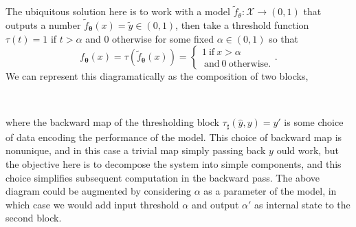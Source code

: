 \documentclass[10pt,a4paper]{article}
\begin{document}
The ubiquitous solution here is to work with a model $\tilde f_\theta:\mathcal X\rightarrow(0,1)$ that outputs a number $\tilde f_{\boldsymbol\theta}(x)=\tilde y\in(0,1)$, then take a threshold function $\tau(t)=1$ if $t>\alpha$ and $0$ otherwise for some fixed $\alpha\in(0,1)$ so that
$$
f_{\boldsymbol\theta}(x)=\tau(\tilde f_{\boldsymbol\theta}(x))=\begin{cases*}1~\text{if}~x>\alpha\\
~\text{and}~0~\text{otherwise.}\end{cases*}.
$$
We can represent this diagramatically as the composition of two blocks,\\
\begin{figure}[H]
\centering
{}\\
\end{figure}
where the backward map of the thresholding block $\tau_\sharp(\hat y,y)=y'$ is some choice of data encoding the performance of the model.
This choice of backward map is nonunique, and in this case a trivial map simply passing back $y$ ould work, but the objective here is to decompose the system into simple components, and this choice simplifies subsequent computation in the backward pass.
The above diagram could be augmented by considering $\alpha$ as a parameter of the model, in which case we would add input threshold $\alpha$ and output $\alpha'$ as internal state to the second block.
\end{document}
